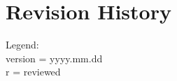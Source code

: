 
\begingroup
\let\cleardoublepage\relax
\let\clearpage\relax

\chapter*{Revision History}
\endgroup

{\vspace{-.5cm}
\footnotesize Legend: \\
version = yyyy.mm.dd \\
r = reviewed}

